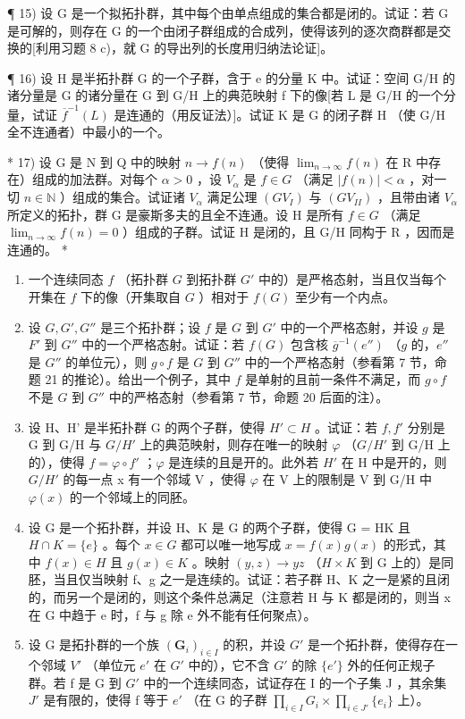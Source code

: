 ¶ 15) 设 G 是一个拟拓扑群，其中每个由单点组成的集合都是闭的。试证：若 G 是可解的，则存在 G 的一个由闭子群组成的合成列，使得该列的逐次商群都是交换的{[}利用习题 8 c)，就 G 的导出列的长度用归纳法论证{]}。

¶ 16) 设 H 是半拓扑群 G 的一个子群，含于 e 的分量 K 中。试证：空间 G/H 的诸分量是 G 的诸分量在 G 到 G/H 上的典范映射 f 下的像{[}若 L 是 G/H 的一个分量，试证 \(\overline{f}^{-1}(L)\) 是连通的（用反证法）{]}。试证 K 是 G 的闭子群 H （使 G/H 全不连通者）中最小的一个。

* 17) 设 G 是 N 到 Q 中的映射 \(n \to f(n)\) （使得 \(\lim_{n \to \infty} f(n)\) 在 R 中存在）组成的加法群。对每个 \(\alpha > 0\) ，设 \(V_{\alpha}\) 是 \(f \in G\) （满足 \(|f(n)| < \alpha\) ，对一切 \(n \in \mathbb{N}\) ）组成的集合。试证诸 \(V_{\alpha}\) 满足公理 \((GV_{I})\) 与 \((GV_{II})\) ，且带由诸 \(V_{\alpha}\) 所定义的拓扑，群 G 是豪斯多夫的且全不连通。设 H 是所有 \(f \in G\) （满足 \(\lim_{n \to \infty} f(n) = 0\) ）组成的子群。试证 H 是闭的，且 G/H 同构于 R ，因而是连通的。 *

\begin{enumerate}
\def\labelenumi{\arabic{enumi})}
\setcounter{enumi}{17}
\item
  一个连续同态 \(f\) （拓扑群 \(G\) 到拓扑群 \(G'\) 中的）是严格态射，当且仅当每个开集在 \(f\) 下的像（开集取自 \(G\) ）相对于 \(f(G)\) 至少有一个内点。
\item
  设 \(G, G', G''\) 是三个拓扑群；设 \(f\) 是 \(G\) 到 \(G'\) 中的一个严格态射，并设 \(g\) 是 \(F'\) 到 \(G''\) 中的一个严格态射。试证：若 \(f(G)\) 包含核 \(\overline{g}^{-1}(e'')\) （\(g\) 的，\(e''\) 是 \(G''\) 的单位元），则 \(g \circ f\) 是 \(G\) 到 \(G''\) 中的一个严格态射（参看第 7 节，命题 21 的推论）。给出一个例子，其中 \(f\) 是单射的且前一条件不满足，而 \(g \circ f\) 不是 \(G\) 到 \(G''\) 中的严格态射（参看第 7 节，命题 20 后面的注）。
\item
  设 H、H' 是半拓扑群 G 的两个子群，使得 \(H' \subset H\) 。试证：若 \(f, f'\) 分别是 G 到 G/H 与 \(G/H'\) 上的典范映射，则存在唯一的映射 \(\varphi\) （\(G/H'\) 到 G/H 上的），使得 \(f = \varphi \circ f'\) ；\(\varphi\) 是连续的且是开的。此外若 \(H'\) 在 H 中是开的，则 \(G/H'\) 的每一点 x 有一个邻域 V ，使得 \(\varphi\) 在 V 上的限制是 V 到 G/H 中 \(\varphi(x)\) 的一个邻域上的同胚。
\item
  设 G 是一个拓扑群，并设 H、K 是 G 的两个子群，使得 G = HK 且 \(H \cap K = \{e\}\) 。每个 \(x \in G\) 都可以唯一地写成 \(x = f(x)g(x)\) 的形式，其中 \(f(x) \in H\) 且 \(g(x) \in K\) 。映射 \((y, z) \to yz\) （\(H \times K\) 到 G 上的）是同胚，当且仅当映射 f、g 之一是连续的。试证：若子群 H、K 之一是紧的且闭的，而另一个是闭的，则这个条件总满足（注意若 H 与 K 都是闭的，则当 x 在 G 中趋于 e 时，f 与 g 除 e 外不能有任何聚点）。
\item
  设 G 是拓扑群的一个族 \((\mathbf{G}_{i})_{i\in I}\) 的积，并设 \(G'\) 是一个拓扑群，使得存在一个邻域 \(V'\) （单位元 \(e'\) 在 \(G'\) 中的），它不含 \(G'\) 的除 \(\{e'\}\) 外的任何正规子群。若 f 是 G 到 \(G'\) 中的一个连续同态，试证存在 I 的一个子集 J ，其余集 \(J'\) 是有限的，使得 f 等于 \(e'\) （在 G 的子群 \(\prod_{i\in I}G_{i}\times\prod_{i\in J'}\{e_{i}\}\) 上）。
\end{enumerate}


